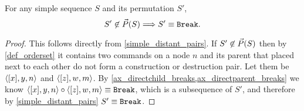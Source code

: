 \begin{mycor}\label{order_is_only_possible}
For any simple sequence $S$ and its permutation $S'$, 
\[ S'\not\in\vec{P}({S}) \Longrightarrow S'\equiv\mathtt{Break}. \]
\end{mycor}
\begin{proof}
This follows directly from \cref{simple_distant_pairs}.
If $S'\not\in\vec{P}({S})$ then by \cref{def_orderset}
it contains two commands on a node $n$ and its parent
that placed next to each other do not form
a construction or destruction pair.
Let them be $\langle{[x],y,n}\rangle$ and $\langle{[z],w,m}\rangle$.
By \cref{ax_directchild_breaks,ax_directparent_breaks}
we know
$\langle{[x],y,n}\rangle\circ\langle{[z],w,m}\rangle\equiv\mathtt{Break}$, which is a subsequence of $S'$,
and therefore by \cref{simple_distant_pairs} $S'\equiv\mathtt{Break}$.
\end{proof}



